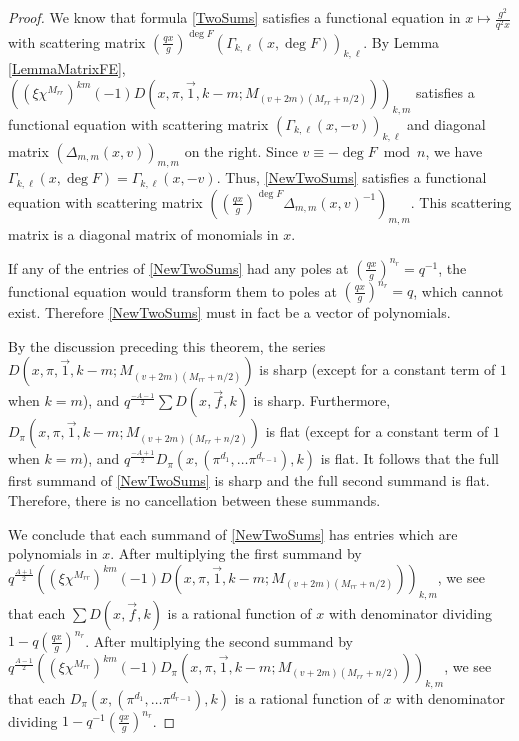 \documentclass[11pt,letterpaper]{article}
\theoremstyle{definition}
\theoremstyle{remark}
\numberwithin{equation}{section}
\theoremstyle{dotless}
\begin{document}
\begin{proof}
We know that formula \eqref{TwoSums} satisfies a functional equation in $x \mapsto  \frac{g^2}{q^2 x}$ with scattering matrix $\left(\frac{qx}{g}\right)^{\deg F}\left( \Gamma_{k, \ell}(x, \deg F)\right)_{k, \ell}$. By Lemma \ref{LemmaMatrixFE}, $\left( (\xi \chi^{M_{rr}})^{k m}(-1)D(x, \pi, \vec{1}, k-m; M_{(v+2m)(M_{rr}+n/2)}) \right)_{k,m}$ satisfies a functional equation with scattering matrix $\left( \Gamma_{k, \ell}(x, -v) \right)_{k, \ell}$ and diagonal matrix $\left(\Delta_{m,m}(x,v)\right)_{m,m}$ on the right. Since $v \equiv -\deg F \bmod n$, we have $\Gamma_{k, \ell}(x, \deg F)=\Gamma_{k, \ell}(x, -v)$. Thus, \eqref{NewTwoSums} satisfies a functional equation with scattering matrix $\left(\left(\frac{qx}{g}\right)^{\deg F}\Delta_{m,m}(x,v)^{-1}\right)_{m,m}$. This scattering matrix is a diagonal matrix of monomials in $x$.  

If any of the entries of \eqref{NewTwoSums} had any poles at $\left(\frac{qx}{g}\right)^{n_r}=q^{-1}$, the functional equation would transform them to poles at $\left(\frac{qx}{g}\right)^{n_r}=q$, which cannot exist. Therefore \eqref{NewTwoSums} must in fact be a vector of polynomials.

By the discussion preceding this theorem, the series $D(x, \pi, \vec{1}, k-m; M_{(v+2m)(M_{rr}+n/2)})$ is sharp (except for a constant term of $1$ when $k=m$), and $q^{\frac{-A-1}{2}} \sum D(x, \vec{f}, k)$ is sharp. Furthermore, $D_\pi(x, \pi, \vec{1}, k-m; M_{(v+2m)(M_{rr}+n/2)})$ is flat (except for a constant term of $1$ when $k=m$), and $q^{\frac{-A+1}{2}} D_\pi(x, (\pi^{d_1}, \ldots \pi^{d_{r-1}}), k)$ is flat. It follows that the full first summand of \eqref{NewTwoSums} is sharp and the full second summand is flat. Therefore, there is no cancellation between these summands. 

We conclude that each summand of \eqref{NewTwoSums} has entries which are polynomials in $x$. After multiplying the first summand by $q^{\frac{A+1}{2}}\left( (\xi \chi^{M_{rr}})^{k m}(-1)D(x, \pi, \vec{1}, k-m; M_{(v+2m)(M_{rr}+n/2)}) \right)_{k,m}$, we see that each $\sum D(x, \vec{f}, k)$ is a rational function of $x$ with denominator dividing $1-q\left(\frac{q x}{g}\right)^{n_r}$. After multiplying the second summand by $q^{\frac{A-1}{2}} \left((\xi \chi^{M_{rr}})^{k m}(-1) D_\pi(x, \pi, \vec{1}, k-m; M_{(v+2m)(M_{rr}+n/2)}) \right)_{k,m}$, we see that each $D_\pi(x, (\pi^{d_1}, \ldots \pi^{d_{r-1}}), k)$ is a rational function of $x$ with denominator dividing $1-q^{-1} \left( \frac{qx}{g}\right)^{n_r}$.


\end{proof}
\end{document}
